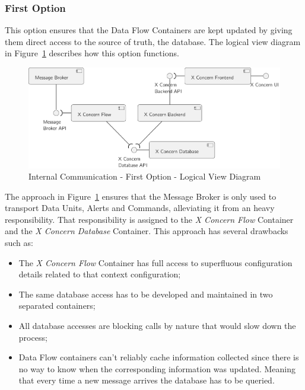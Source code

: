 \subsubsection{First Option}
\label{subsubsec:design:alternatives:internal:first}

This option ensures that the Data Flow Containers are kept updated by giving them direct access to the source of truth, the database. The logical view diagram in Figure~\ref{fig:design:alternatives:internal:first:diagram} describes how this option functions.

\begin{figure}[H]
   \centering
   \includegraphics[page=1,width=0.8\columnwidth]{assets/diagrams/design/alternatives/internal/alternative1.pdf}
   \caption[Internal Communication - First Option - Logical View Diagram]{Internal Communication - First Option - Logical View Diagram}
   \label{fig:design:alternatives:internal:first:diagram}
\end{figure}

The approach in Figure~\ref{fig:design:alternatives:internal:first:diagram} ensures that the Message Broker is only used to transport Data Units, Alerts and Commands, alleviating it from an heavy responsibility.
That responsibility is assigned to the \textit{X Concern Flow} Container and the \textit{X Concern Database} Container.
This approach has several drawbacks such as:

\begin{itemize}
   \item The \textit{X Concern Flow} Container has full access to superfluous configuration details related to that context configuration;
   \item The same database access has to be developed and maintained in two separated containers;
   \item All database accesses are blocking calls by nature that would slow down the process;
   \item Data Flow containers can't reliably cache information collected since there is no way to know when the corresponding information was updated. Meaning that every time a new message arrives the database has to be queried.
\end{itemize}

